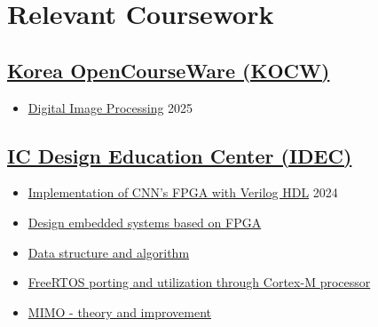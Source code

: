 \documentclass[a4paper,9pt]{extarticle}
\begin{document}
\section*{Relevant Coursework}
\subsection*{\href{https://www.kocw.net/home/index.do}{Korea OpenCourseWare (KOCW)}}
\begin{itemize}
    \item \href{https://github.com/user-attachments/assets/d8024d63-359a-493b-9cb2-774e36a03f62}{Digital Image Processing}                                              \hfill 2025
\end{itemize}

\subsection*{\href{https://www.idec.or.kr/main/}{IC Design Education Center (IDEC)}}
\begin{itemize}
    \item \href{https://github.com/user-attachments/assets/234ad610-a051-4140-9f20-48ca4d8e4d42}{Implementation of CNN's FPGA with Verilog HDL}                                          \hfill 2024
    \item \href{https://github.com/user-attachments/assets/68b0ae05-462b-4750-93ba-1bc4072dab66}{Design embedded systems based on FPGA}
    \item \href{https://github.com/user-attachments/assets/8fbda935-4b41-44f7-b83a-8d284f003168}{Data structure and algorithm}                                          
    \item \href{https://github.com/user-attachments/assets/805bbc13-3e6e-43d6-af75-df31f728d607}{FreeRTOS porting and utilization through Cortex-M processor}           
    \item \href{https://github.com/user-attachments/assets/707a4f8e-3b5a-4246-a763-81e2729f9cb2}{MIMO - theory and improvement}                                         
\end{itemize}
\end{document}
